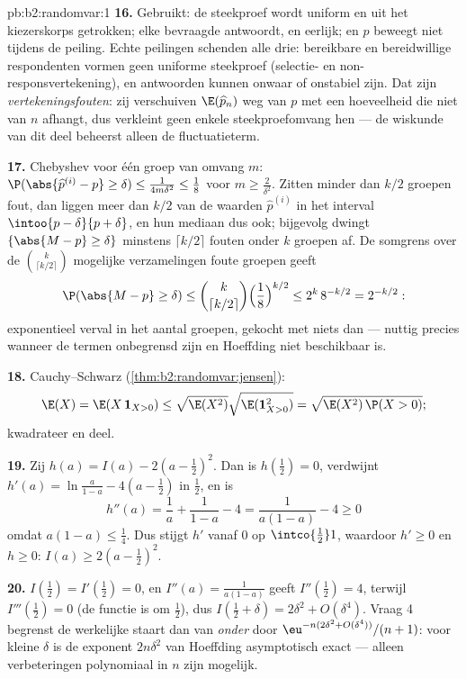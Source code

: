 \begin{solution}{pb:b2:randomvar:1}
\textbf{16.} Gebruikt: de steekproef wordt uniform en 
uit het kiezerskorps getrokken; elke bevraagde antwoordt, en
eerlijk; en $p$ beweegt niet tijdens de peiling. Echte peilingen
schenden alle drie: bereikbare en bereidwillige respondenten vormen
geen uniforme steekproef (selectie- en non-responsvertekening), en
antwoorden kunnen onwaar of onstabiel zijn. Dat zijn
\emph{vertekeningsfouten}: zij verschuiven $\E(\widehat p_n)$ weg
van $p$ met een hoeveelheid die niet van $n$ afhangt, dus verkleint
geen enkele steekproefomvang hen --- de wiskunde van dit deel
beheerst alleen de fluctuatieterm.

\textbf{17.} Chebyshev voor één groep van omvang $m$:
$\P(\abs{\widehat p^{(i)} - p} \geq \delta) \leq
\frac{1}{4m\delta^2} \leq \frac18$ voor $m \geq \frac2{\delta^2}$.
Zitten minder dan $k/2$ groepen fout, dan liggen meer dan $k/2$ van
de waarden $\widehat p^{(i)}$ in het  interval $\intoo{p -
\delta}{p + \delta}$, en hun mediaan dus ook; bijgevolg dwingt
$\{\abs{M - p} \geq \delta\}$ minstens $\lceil k/2\rceil$ fouten
onder $k$  groepen af. De somgrens over de $\binom
k{\lceil k/2\rceil}$ mogelijke verzamelingen foute groepen geeft
\[
\P(\abs{M - p} \geq \delta)
\leq \binom{k}{\lceil k/2\rceil}
\Bigl(\frac18\Bigr)^{k/2}
\leq 2^k\,8^{-k/2} = 2^{-k/2} :
\]
exponentieel verval in het aantal groepen, gekocht met niets dan
 --- nuttig precies wanneer de termen onbegrensd zijn en
Hoeffding niet beschikbaar is.

\textbf{18.} Cauchy--Schwarz (\cref{thm:b2:randomvar:jensen}):
\[
\E(X) = \E(X\,\mathbf 1_{X>0})
\leq \sqrt{\E(X^2)}\sqrt{\E(\mathbf 1_{X>0}^2)}
= \sqrt{\E(X^2)\,\P(X > 0)} ;
\]
kwadrateer en deel.

\textbf{19.} Zij $h(a) = I(a) - 2(a - \tfrac12)^2$. Dan is
$h(\tfrac12) = 0$, verdwijnt $h'(a) = \ln\frac a{1-a} - 4(a -
\tfrac12)$ in $\tfrac12$, en is
\[
h''(a) = \frac1a + \frac1{1-a} - 4 = \frac{1}{a(1-a)} - 4
\geq 0
\]
omdat $a(1-a) \leq \frac14$. Dus stijgt $h'$ vanaf $0$ op
$\intco{\frac12}1$, waardoor $h' \geq 0$ en $h \geq 0$: $I(a) \geq
2(a - \tfrac12)^2$.

\textbf{20.} $I(\tfrac12) = I'(\tfrac12) = 0$, en $I''(a) =
\frac1{a(1-a)}$ geeft $I''(\tfrac12) = 4$, terwijl
$I'''(\tfrac12) = 0$ (de functie is  om $\tfrac12$), dus
$I(\tfrac12 + \delta) = 2\delta^2 + O(\delta^4)$. Vraag 4 begrenst
de werkelijke staart dan van \emph{onder} door $\eu^{-n(2\delta^2 +
O(\delta^4))}/(n+1)$: voor kleine $\delta$ is de exponent
$2n\delta^2$ van Hoeffding asymptotisch exact --- alleen
verbeteringen polynomiaal in $n$ zijn mogelijk.


\end{solution}
